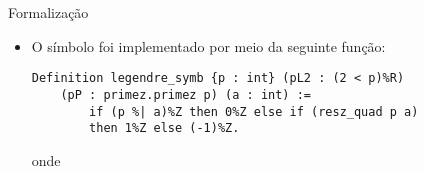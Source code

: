 \begin{frame}[fragile]{Formalização}
    \begin{itemize}
        \item O símbolo foi implementado por meio da seguinte função:
        \noindent
        \begin{lstlisting}[language=coq,frame=single,tabsize=1]
Definition legendre_symb {p : int} (pL2 : (2 < p)%R) 
    (pP : primez.primez p) (a : int) :=
        if (p %| a)%Z then 0%Z else if (resz_quad p a)
        then 1%Z else (-1)%Z.
        \end{lstlisting}
        onde 
    \end{itemize}
\end{frame}